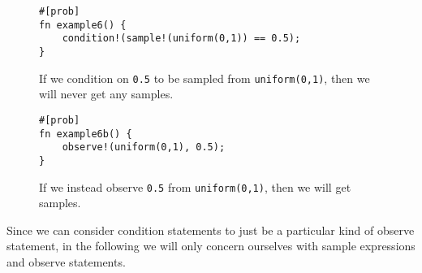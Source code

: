 \begin{figure}[h]
\begin{lstlisting}
#[prob]
fn example6() {
    condition!(sample!(uniform(0,1)) == 0.5);
}
\end{lstlisting}
\caption{If we condition on \lstinline{0.5} to be sampled from \lstinline{uniform(0,1)}, then we will never get any samples.}
\label{example6}
\end{figure}

\begin{figure}[h]
\begin{lstlisting}
#[prob]
fn example6b() {
    observe!(uniform(0,1), 0.5);
}
\end{lstlisting}
\caption{If we instead observe \lstinline{0.5} from \lstinline{uniform(0,1)}, then we will get samples.}
\label{example6b}
\end{figure}
            

Since we can consider condition statements to just be a particular kind of observe statement, in the following we will only concern ourselves with sample expressions and observe statements.
